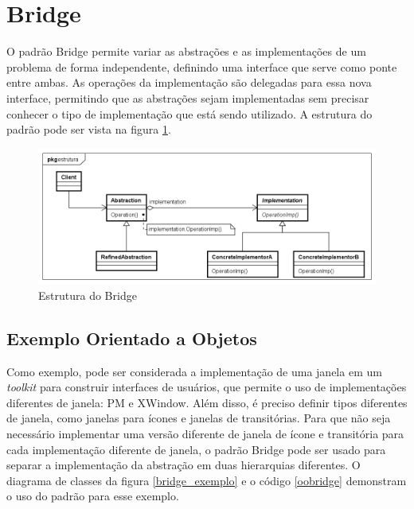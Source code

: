 \section{Bridge}

O padrão Bridge permite variar as abstrações e as 
implementações de um problema de forma independente, 
definindo uma interface que serve como ponte entre ambas. 
As operações da implementação são delegadas para essa 
nova interface, permitindo que as abstrações sejam 
implementadas sem precisar conhecer o tipo de 
implementação que está sendo utilizado. A estrutura do 
padrão pode ser vista na figura \ref{bridge_struct}.

\begin{figure}[htb]
	\caption{\label{bridge_struct}Estrutura do Bridge}
	\begin{center}
	    \includegraphics[scale=0.5]{5_padroes-contexto-funcional/5.2_estruturais/5.2.2_bridge/bridge_estrutura.png}
	\end{center}
\end{figure}

\subsection*{Exemplo Orientado a Objetos}

Como exemplo, pode ser considerada a implementação de 
uma janela em um \textit{toolkit} para construir interfaces 
de usuários, que permite o uso de implementações diferentes 
de janela: PM e XWindow. Além disso, é preciso definir tipos 
diferentes de janela, como janelas para ícones e janelas 
de transitórias. Para que não seja necessário implementar 
uma versão diferente de janela de ícone e transitória 
para cada implementação diferente de janela, o padrão 
Bridge pode ser usado para separar a implementação 
da abstração em duas hierarquias diferentes. O diagrama 
de classes da figura \ref{bridge_exemplo} e o código 
\ref{oobridge} demonstram o uso do padrão para esse 
exemplo.

